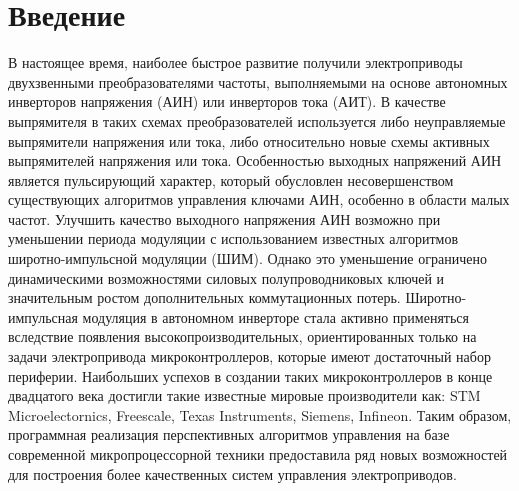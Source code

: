 \section*{Введение}
    В настоящее время, наиболее быстрое развитие получили электроприводы двухзвенными
    преобразователями частоты, выполняемыми на основе автономных инверторов напряжения (АИН) или
    инверторов тока (АИТ). В качестве выпрямителя в таких схемах преобразователей используется либо
    неуправляемые выпрямители напряжения или тока, либо относительно новые схемы активных
    выпрямителей напряжения или тока.  Особенностью выходных напряжений АИН является пульсирующий
    характер, который обусловлен несовершенством существующих алгоритмов управления ключами АИН,
    особенно в области малых частот.  Улучшить качество выходного напряжения АИН возможно при
    уменьшении периода модуляции с использованием известных алгоритмов широтно-импульсной модуляции
    (ШИМ). Однако это уменьшение ограничено динамическими возможностями силовых полупроводниковых
    ключей и значительным ростом дополнительных коммутационных потерь.  Широтно-импульсная модуляция
    в автономном инверторе стала активно применяться вследствие появления высокопроизводительных,
    ориентированных только на задачи электропривода микроконтроллеров, которые имеют достаточный
    набор периферии. Наибольших успехов в создании таких микроконтроллеров в конце двадцатого века
    достигли такие известные мировые производители как: STM Microelectornics, Freescale, Texas
    Instruments, Siemens, Infineon. Таким образом, программная реализация перспективных алгоритмов
    управления на базе современной микропроцессорной техники предоставила ряд новых возможностей для
    построения более качественных систем управления электроприводов. 
